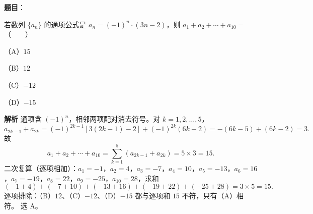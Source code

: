 \begin{answer}

\textbf{题目}：

若数列 $\{a_n\}$ 的通项公式是 $a_n=(-1)^n\cdot(3n-2)$，则 $a_1+a_2+\cdots+a_{10}=$\mbox{（　　）}

（A）$15$

（B）$12$

（C）$-12$

（D）$-15$

\textbf{解析}
通项含 $(-1)^n$，相邻两项配对消去符号。对 $k=1,2,\dots,5$，
\nopagebreak[4]
\[
a_{2k-1}+a_{2k}=(-1)^{2k-1}\left[3(2k-1)-2\right]+(-1)^{2k}(6k-2)=-(6k-5)+(6k-2)=3.
\]
故
\nopagebreak[4]
\[
a_1+a_2+\cdots+a_{10}=\sum_{k=1}^{5}(a_{2k-1}+a_{2k})=5\times3=15.
\]
二次复算（逐项相加）：$a_1=-1$，$a_2=4$，$a_3=-7$，$a_4=10$，$a_5=-13$，$a_6=16$，$a_7=-19$，$a_8=22$，$a_9=-25$，$a_{10}=28$，求和
\nopagebreak[4]
\[
(-1+4)+(-7+10)+(-13+16)+(-19+22)+(-25+28)=3\times5=15.
\]
逐项排除：（B）$12$、（C）$-12$、（D）$-15$ 都与逐项和 $15$ 不符，只有（A）相符。
选 A。


\end{answer}
